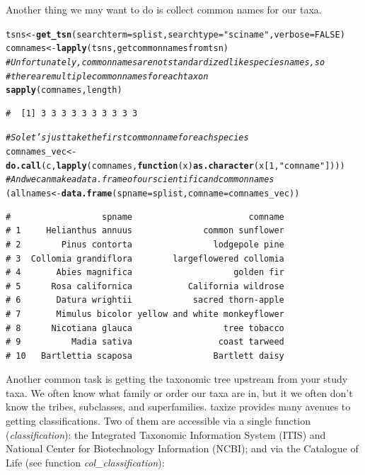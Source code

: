\documentclass[letterpaper,superscriptaddress,showkeys,longbibliography]{revtex4-1}\usepackage[]{graphicx}\usepackage[]{color}
\makeatletter
\newcommand{\hlnum}[1]{\textcolor[rgb]{0.686,0.059,0.569}{#1}}%
\newcommand{\hlstr}[1]{\textcolor[rgb]{0.192,0.494,0.8}{#1}}%
\newcommand{\hlcom}[1]{\textcolor[rgb]{0.678,0.584,0.686}{\textit{#1}}}%
\newcommand{\hlstd}[1]{\textcolor[rgb]{0.345,0.345,0.345}{#1}}%
\newcommand{\hlkwa}[1]{\textcolor[rgb]{0.161,0.373,0.58}{\textbf{#1}}}%
\newcommand{\hlkwb}[1]{\textcolor[rgb]{0.69,0.353,0.396}{#1}}%
\newcommand{\hlkwc}[1]{\textcolor[rgb]{0.333,0.667,0.333}{#1}}%
\newcommand{\hlkwd}[1]{\textcolor[rgb]{0.737,0.353,0.396}{\textbf{#1}}}%
\newenvironment{kframe}{%
 \def\at@end@of@kframe{}%
 \ifinner\ifhmode%
  \def\at@end@of@kframe{\end{minipage}}%
  \begin{minipage}{\columnwidth}%
 \fi\fi%
 \def\FrameCommand##1{\hskip\@totalleftmargin \hskip-\fboxsep
 \colorbox{shadecolor}{##1}\hskip-\fboxsep
     \hskip-\linewidth \hskip-\@totalleftmargin \hskip\columnwidth}%
 \MakeFramed {\advance\hsize-\width
   \@totalleftmargin\z@ \linewidth\hsize
   \@setminipage}}%
 {\par\unskip\endMakeFramed%
 \at@end@of@kframe}
\newenvironment{knitrout}{}{} %
\makeatother
\begin{document}
Another thing we may want to do is collect common names for our taxa. 

\begin{knitrout}
\color{fgcolor}\begin{kframe}
\begin{alltt}
\hlstd{tsns} \hlkwb{<-} \hlkwd{get_tsn}\hlstd{(}\hlkwc{searchterm} \hlstd{= splist,} \hlkwc{searchtype} \hlstd{=} \hlstr{"sciname"}\hlstd{,} \hlkwc{verbose} \hlstd{=} \hlnum{FALSE}\hlstd{)}
\hlstd{comnames} \hlkwb{<-} \hlkwd{lapply}\hlstd{(tsns, getcommonnamesfromtsn)}
\hlcom{# Unfortunately, common names are not standardized like species names, so}
\hlcom{# there are multiple common names for each taxon}
\hlkwd{sapply}\hlstd{(comnames, length)}
\end{alltt}
\begin{verbatim}
#  [1] 3 3 3 3 3 3 3 3 3 3
\end{verbatim}
\begin{alltt}
\hlcom{# So let's just take the first common name for each species}
\hlstd{comnames_vec} \hlkwb{<-} \hlkwd{do.call}\hlstd{(c,} \hlkwd{lapply}\hlstd{(comnames,} \hlkwa{function}\hlstd{(}\hlkwc{x}\hlstd{)} \hlkwd{as.character}\hlstd{(x[}\hlnum{1}\hlstd{,} \hlstr{"comname"}\hlstd{])))}
\hlcom{# And we can make a data.frame of our scientific and common names}
\hlstd{(allnames} \hlkwb{<-} \hlkwd{data.frame}\hlstd{(}\hlkwc{spname} \hlstd{= splist,} \hlkwc{comname} \hlstd{= comnames_vec))}
\end{alltt}
\begin{verbatim}
#                  spname                       comname
# 1     Helianthus annuus              common sunflower
# 2        Pinus contorta                lodgepole pine
# 3  Collomia grandiflora        largeflowered collomia
# 4       Abies magnifica                    golden fir
# 5      Rosa californica           California wildrose
# 6       Datura wrightii            sacred thorn-apple
# 7       Mimulus bicolor yellow and white monkeyflower
# 8      Nicotiana glauca                  tree tobacco
# 9          Madia sativa                 coast tarweed
# 10   Bartlettia scaposa                Bartlett daisy
\end{verbatim}
\end{kframe}
\end{knitrout}


Another common task is getting the taxonomic tree upstream from your study taxa. We often know what family or order our taxa are in, but it we often don't know the tribes, subclasses, and superfamilies. taxize provides many avenues to getting classifications. Two of them are accessible via a single function (\emph{classification}): the Integrated Taxonomic Information System (ITIS) and National Center for Biotechnology Information (NCBI); and via the Catalogue of Life (see function \emph{col\_classification}):
\end{document}
